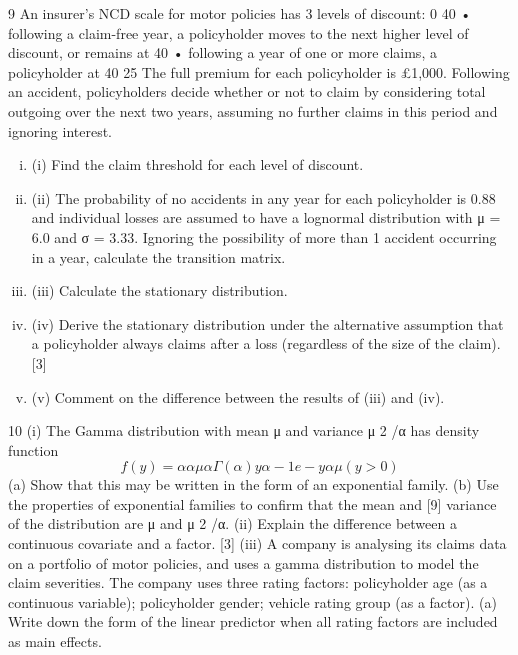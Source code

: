 \documentclass[a4paper,12pt]{article}
\begin{document}
\begin{enumerate}

9
An insurer’s NCD scale for motor policies has 3 levels of discount: 0%
40%
• following a claim-free year, a policyholder moves to the next higher level of
discount, or remains at 40%
• following a year of one or more claims, a policyholder at 40%
25%
The full premium for each policyholder is £1,000. Following an accident,
policyholders decide whether or not to claim by considering total outgoing over the next two years, assuming no further claims in this period and ignoring interest.
\begin{enumerate}[(i)]
\item (i) Find the claim threshold for each level of discount.
\item (ii) The probability of no accidents in any year for each policyholder is 0.88 and
individual losses are assumed to have a lognormal distribution with μ = 6.0
and σ = 3.33. Ignoring the possibility of more than 1 accident occurring in a
year, calculate the transition matrix.
\item (iii) Calculate the stationary distribution.
\item (iv) Derive the stationary distribution under the alternative assumption that a
policyholder always claims after a loss (regardless of the size of the claim). [3]
\item (v) Comment on the difference between the results of (iii) and (iv).
\end{enumerate}
10
(i)
The Gamma distribution with mean μ and variance μ 2 /α has density function
\[f(y) =
α α
μ α Γ ( α )
y
α− 1
e
−
y α
μ
( y > 0 )\]
(a) Show that this may be written in the form of an exponential family.
(b) Use the properties of exponential families to confirm that the mean and
[9]
variance of the distribution are μ and μ 2 /α.
(ii) Explain the difference between a continuous covariate and a factor.
[3]
(iii) A company is analysing its claims data on a portfolio of motor policies, and uses a gamma distribution to model the claim severities. The company uses
three rating factors:
policyholder age (as a continuous variable);
policyholder gender;
vehicle rating group (as a factor).
(a) Write down the form of the linear predictor when all rating factors are included as main effects.

\end{enumerate}
\end{document}
